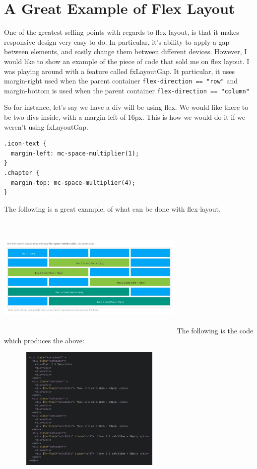 \section{ A Great Example of Flex Layout }

One of the greatest selling points with regards to flex layout, is that it makes
responsive design very easy to do. In particular, it's ability to apply a gap
between elements, and easily change them between different devices. However, I
would like to show an example of the piece of code that sold me on flex layout.
I was playing around with a feature called fxLayoutGap. It particular, it uses
margin-right used when the parent container \lstinline{flex-direction == "row"}
and margin-bottom is used when the parent container \lstinline{flex-direction == "column"}

So for instance, let's say we have a div will be using flex. We would like
there to be two divs inside, with a margin-left of 16px. This is how we would
do it if we weren't using fxLayoutGap.
\begin{lstlisting}
.icon-text {
  margin-left: mc-space-multiplier(1);
}
.chapter {
  margin-top: mc-space-multiplier(4);
}
\end{lstlisting}


The following is a great example, of what can be done with flex-layout.


\includegraphics[width=9.1cm, height=6cm]{pwa/responsive/flex-layout/flex-layout-grid}
The following is the code which produces the above:


\includegraphics[width=9.1cm, height=6cm]{pwa/responsive/flex-layout/flex-layout-code}
